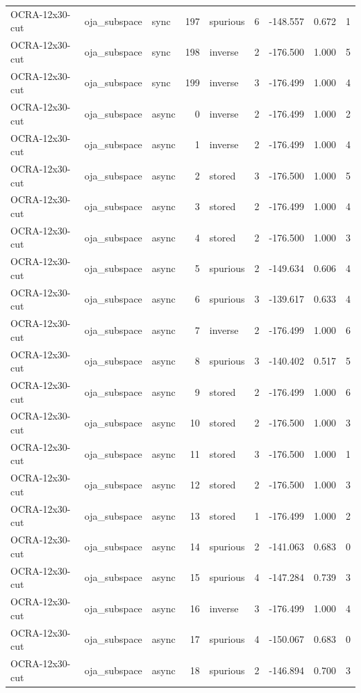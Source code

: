 \begin{tabular}{lllrlrrrr}
OCRA-12x30-cut & oja\_subspace & sync & 197 & spurious & 6 & -148.557 & 0.672 & 1 \\
OCRA-12x30-cut & oja\_subspace & sync & 198 & inverse & 2 & -176.500 & 1.000 & 5 \\
OCRA-12x30-cut & oja\_subspace & sync & 199 & inverse & 3 & -176.499 & 1.000 & 4 \\
OCRA-12x30-cut & oja\_subspace & async & 0 & inverse & 2 & -176.499 & 1.000 & 2 \\
OCRA-12x30-cut & oja\_subspace & async & 1 & inverse & 2 & -176.499 & 1.000 & 4 \\
OCRA-12x30-cut & oja\_subspace & async & 2 & stored & 3 & -176.500 & 1.000 & 5 \\
OCRA-12x30-cut & oja\_subspace & async & 3 & stored & 2 & -176.499 & 1.000 & 4 \\
OCRA-12x30-cut & oja\_subspace & async & 4 & stored & 2 & -176.500 & 1.000 & 3 \\
OCRA-12x30-cut & oja\_subspace & async & 5 & spurious & 2 & -149.634 & 0.606 & 4 \\
OCRA-12x30-cut & oja\_subspace & async & 6 & spurious & 3 & -139.617 & 0.633 & 4 \\
OCRA-12x30-cut & oja\_subspace & async & 7 & inverse & 2 & -176.499 & 1.000 & 6 \\
OCRA-12x30-cut & oja\_subspace & async & 8 & spurious & 3 & -140.402 & 0.517 & 5 \\
OCRA-12x30-cut & oja\_subspace & async & 9 & stored & 2 & -176.499 & 1.000 & 6 \\
OCRA-12x30-cut & oja\_subspace & async & 10 & stored & 2 & -176.500 & 1.000 & 3 \\
OCRA-12x30-cut & oja\_subspace & async & 11 & stored & 3 & -176.500 & 1.000 & 1 \\
OCRA-12x30-cut & oja\_subspace & async & 12 & stored & 2 & -176.500 & 1.000 & 3 \\
OCRA-12x30-cut & oja\_subspace & async & 13 & stored & 1 & -176.499 & 1.000 & 2 \\
OCRA-12x30-cut & oja\_subspace & async & 14 & spurious & 2 & -141.063 & 0.683 & 0 \\
OCRA-12x30-cut & oja\_subspace & async & 15 & spurious & 4 & -147.284 & 0.739 & 3 \\
OCRA-12x30-cut & oja\_subspace & async & 16 & inverse & 3 & -176.499 & 1.000 & 4 \\
OCRA-12x30-cut & oja\_subspace & async & 17 & spurious & 4 & -150.067 & 0.683 & 0 \\
OCRA-12x30-cut & oja\_subspace & async & 18 & spurious & 2 & -146.894 & 0.700 & 3 \\

\end{tabular}
